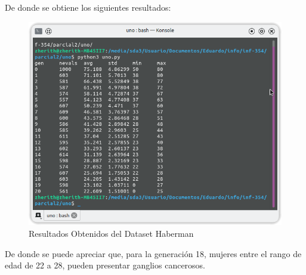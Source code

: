 De donde se obtiene los siguientes resultados:
\begin{figure}[H]
	\centering
	\includegraphics[width=0.8\linewidth]{im/uno.png}
	\caption[Resultados Obtenidos del Dataset Haberman]{Resultados Obtenidos del Dataset Haberman}
\end{figure}
De donde se puede apreciar que, para la generación 18, mujeres entre el rango de edad de 22 a 28, pueden presentar ganglios cancerosos.






